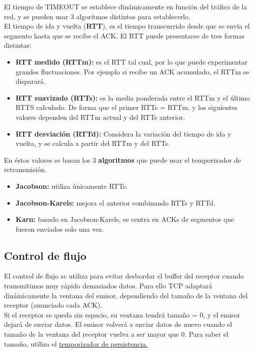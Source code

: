 \begin{onepage}
\begin{tcolorbox}[
title=Temporizador de retransmisión (TIMEOUT),
colback=cyan!5!white,
colframe=cyan!75!black,
fonttitle=\bfseries]
El tiempo de TIMEOUT se establece dinámicamente en función del tráfico de la red, y se pueden usar 3 algoritmos distintos para establecerlo.\\

El tiempo de ida y vuelta (\textbf{RTT}), es el tiempo transcurrido desde que se envía el
segmento hasta que se recibe el ACK. El RTT puede presentarse de tres formas distintas:
\begin{itemize}
    \item \textbf{RTT medido (RTTm): }es el RTT tal cual, por lo que puede experimentar grandes fluctuaciones. Por ejemplo si recibe un ACK acumulado, el RTTm se disparará.
    \item \textbf{RTT suavizado (RTTs): }es la media ponderada entre el RTTm y el último RTTS calculado. De forma que el primer RTTs = RTTm, y los siguientes valores dependen del RTTm actual y del RTTs anterior.
    \item \textbf{RTT desviación (RTTd): }Considera la variación del tiempo de ida y vuelta, y se calcula a partir del RTTm y del RTTs.
\end{itemize}

En éstos valores se basan los 3 \textbf{algoritmos} que puede usar el temporizador de retransmisión.
\begin{itemize}
    \item \textbf{Jacobson: }utiliza únicamente RTTs.
    \item \textbf{Jacobson-Karels: }mejora el anterior combinando RTTs y RTTd.
    \item \textbf{Karn: }basado en Jacobson-Karels, se centra en ACKs de segmentos que fueron enviados solo una vez.
\end{itemize}
\end{tcolorbox}
\subsection{Control de flujo}
El control de flujo se utiliza para evitar desbordar el buffer del receptor cuando transmitimos muy rápido demasiados datos. Para ello TCP adaptará dinámicamente la ventana del emisor, dependiendo del tamaño de la ventana del receptor (anunciado cada ACK).\\

Si el receptor se queda sin espacio, su ventana tendrá tamaño = 0, y el emisor dejará de enviar datos. El emisor volverá a enviar datos de nuevo cuando el tamaño de la ventana del receptor vuelva a ser mayor que 0. Para saber el tamaño, utiliza el \underline{\hyperref[tempers]{temporizador de persistencia.}}

\end{onepage}
